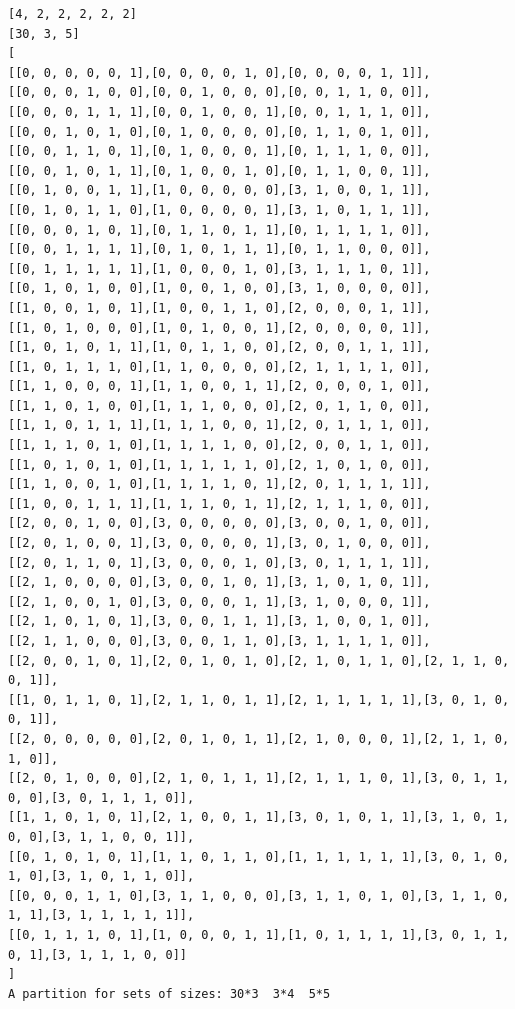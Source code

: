 \documentclass[final]{dmtcs-episciences}
\begin{document}
\begin{appendices}
\begin{verbatim} 
[4, 2, 2, 2, 2, 2]
[30, 3, 5]
[
[[0, 0, 0, 0, 0, 1],[0, 0, 0, 0, 1, 0],[0, 0, 0, 0, 1, 1]],
[[0, 0, 0, 1, 0, 0],[0, 0, 1, 0, 0, 0],[0, 0, 1, 1, 0, 0]],
[[0, 0, 0, 1, 1, 1],[0, 0, 1, 0, 0, 1],[0, 0, 1, 1, 1, 0]],
[[0, 0, 1, 0, 1, 0],[0, 1, 0, 0, 0, 0],[0, 1, 1, 0, 1, 0]],
[[0, 0, 1, 1, 0, 1],[0, 1, 0, 0, 0, 1],[0, 1, 1, 1, 0, 0]],
[[0, 0, 1, 0, 1, 1],[0, 1, 0, 0, 1, 0],[0, 1, 1, 0, 0, 1]],
[[0, 1, 0, 0, 1, 1],[1, 0, 0, 0, 0, 0],[3, 1, 0, 0, 1, 1]],
[[0, 1, 0, 1, 1, 0],[1, 0, 0, 0, 0, 1],[3, 1, 0, 1, 1, 1]],
[[0, 0, 0, 1, 0, 1],[0, 1, 1, 0, 1, 1],[0, 1, 1, 1, 1, 0]],
[[0, 0, 1, 1, 1, 1],[0, 1, 0, 1, 1, 1],[0, 1, 1, 0, 0, 0]],
[[0, 1, 1, 1, 1, 1],[1, 0, 0, 0, 1, 0],[3, 1, 1, 1, 0, 1]],
[[0, 1, 0, 1, 0, 0],[1, 0, 0, 1, 0, 0],[3, 1, 0, 0, 0, 0]],
[[1, 0, 0, 1, 0, 1],[1, 0, 0, 1, 1, 0],[2, 0, 0, 0, 1, 1]],
[[1, 0, 1, 0, 0, 0],[1, 0, 1, 0, 0, 1],[2, 0, 0, 0, 0, 1]],
[[1, 0, 1, 0, 1, 1],[1, 0, 1, 1, 0, 0],[2, 0, 0, 1, 1, 1]],
[[1, 0, 1, 1, 1, 0],[1, 1, 0, 0, 0, 0],[2, 1, 1, 1, 1, 0]],
[[1, 1, 0, 0, 0, 1],[1, 1, 0, 0, 1, 1],[2, 0, 0, 0, 1, 0]],
[[1, 1, 0, 1, 0, 0],[1, 1, 1, 0, 0, 0],[2, 0, 1, 1, 0, 0]],
[[1, 1, 0, 1, 1, 1],[1, 1, 1, 0, 0, 1],[2, 0, 1, 1, 1, 0]],
[[1, 1, 1, 0, 1, 0],[1, 1, 1, 1, 0, 0],[2, 0, 0, 1, 1, 0]],
[[1, 0, 1, 0, 1, 0],[1, 1, 1, 1, 1, 0],[2, 1, 0, 1, 0, 0]],
[[1, 1, 0, 0, 1, 0],[1, 1, 1, 1, 0, 1],[2, 0, 1, 1, 1, 1]],
[[1, 0, 0, 1, 1, 1],[1, 1, 1, 0, 1, 1],[2, 1, 1, 1, 0, 0]],
[[2, 0, 0, 1, 0, 0],[3, 0, 0, 0, 0, 0],[3, 0, 0, 1, 0, 0]],
[[2, 0, 1, 0, 0, 1],[3, 0, 0, 0, 0, 1],[3, 0, 1, 0, 0, 0]],
[[2, 0, 1, 1, 0, 1],[3, 0, 0, 0, 1, 0],[3, 0, 1, 1, 1, 1]],
[[2, 1, 0, 0, 0, 0],[3, 0, 0, 1, 0, 1],[3, 1, 0, 1, 0, 1]],
[[2, 1, 0, 0, 1, 0],[3, 0, 0, 0, 1, 1],[3, 1, 0, 0, 0, 1]],
[[2, 1, 0, 1, 0, 1],[3, 0, 0, 1, 1, 1],[3, 1, 0, 0, 1, 0]],
[[2, 1, 1, 0, 0, 0],[3, 0, 0, 1, 1, 0],[3, 1, 1, 1, 1, 0]],
[[2, 0, 0, 1, 0, 1],[2, 0, 1, 0, 1, 0],[2, 1, 0, 1, 1, 0],[2, 1, 1, 0, 0, 1]],
[[1, 0, 1, 1, 0, 1],[2, 1, 1, 0, 1, 1],[2, 1, 1, 1, 1, 1],[3, 0, 1, 0, 0, 1]],
[[2, 0, 0, 0, 0, 0],[2, 0, 1, 0, 1, 1],[2, 1, 0, 0, 0, 1],[2, 1, 1, 0, 1, 0]],
[[2, 0, 1, 0, 0, 0],[2, 1, 0, 1, 1, 1],[2, 1, 1, 1, 0, 1],[3, 0, 1, 1, 0, 0],[3, 0, 1, 1, 1, 0]],
[[1, 1, 0, 1, 0, 1],[2, 1, 0, 0, 1, 1],[3, 0, 1, 0, 1, 1],[3, 1, 0, 1, 0, 0],[3, 1, 1, 0, 0, 1]],
[[0, 1, 0, 1, 0, 1],[1, 1, 0, 1, 1, 0],[1, 1, 1, 1, 1, 1],[3, 0, 1, 0, 1, 0],[3, 1, 0, 1, 1, 0]],
[[0, 0, 0, 1, 1, 0],[3, 1, 1, 0, 0, 0],[3, 1, 1, 0, 1, 0],[3, 1, 1, 0, 1, 1],[3, 1, 1, 1, 1, 1]],
[[0, 1, 1, 1, 0, 1],[1, 0, 0, 0, 1, 1],[1, 0, 1, 1, 1, 1],[3, 0, 1, 1, 0, 1],[3, 1, 1, 1, 0, 0]]
]
A partition for sets of sizes: 30*3  3*4  5*5
\end{verbatim}
\newpage


\end{appendices}
\end{document}
